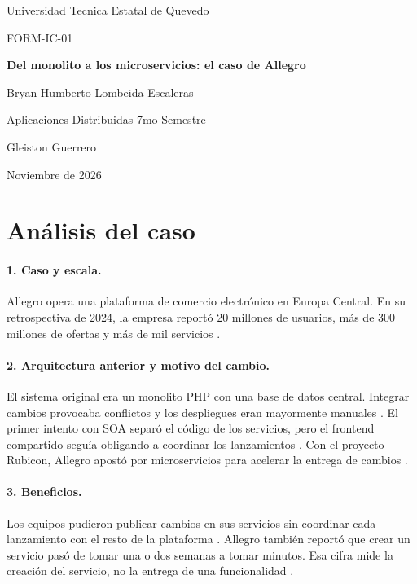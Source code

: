 \documentclass[11pt,a4paper]{article}
\newcommand{\estudiante}{Bryan Humberto Lombeida Escaleras}
\newcommand{\institucion}{Universidad Tecnica Estatal de Quevedo}
\newcommand{\curso}{Aplicaciones Distribuidas 7mo Semestre}
\newcommand{\docente}{Gleiston Guerrero}
\begin{document}
\hypersetup{pageanchor=false}
\begin{titlepage}
  \centering
  {\Large \institucion\par}
  \vfill
  {\large FORM-IC-01\par}
  \medskip
  {\LARGE\bfseries Del monolito a los microservicios: el caso de Allegro\par}
  \vfill
  {\large \estudiante\par
  \curso\par
  \docente\par}
  \vfill
  {\large Noviembre de 2026\par}
  \medskip
\end{titlepage}
\hypersetup{pageanchor=true}

\section*{Análisis del caso}

\paragraph{1. Caso y escala.}
Allegro opera una plataforma de comercio electrónico en Europa Central. En su
retrospectiva de 2024, la empresa reportó 20 millones de usuarios, más de 300
millones de ofertas y más de mil servicios \cite{kosmulski2024allegro}.

\paragraph{2. Arquitectura anterior y motivo del cambio.}
El sistema original era un monolito PHP con una base de datos central. Integrar
cambios provocaba conflictos y los despliegues eran mayormente manuales
\cite{kosmulski2024allegro}. %
El primer intento con SOA separó el código de los servicios, pero el frontend
compartido seguía obligando a coordinar los lanzamientos
\cite{ignasiak2015architecture}. %
Con el proyecto Rubicon, Allegro apostó por microservicios para acelerar la
entrega de cambios \cite{kosmulski2024allegro}. %

\paragraph{3. Beneficios.}
Los equipos pudieron publicar cambios en sus servicios sin coordinar cada
lanzamiento con el resto de la plataforma \cite{ignasiak2015architecture}.
Allegro también reportó que crear un servicio pasó de tomar una o dos semanas
a tomar minutos. Esa cifra mide la creación del servicio, no la entrega de
una funcionalidad \cite{kosmulski2024allegro}. %
\end{document}
